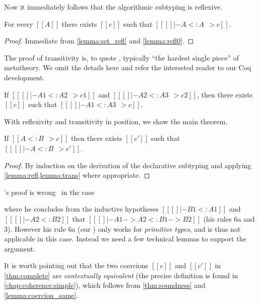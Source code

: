 Now it immediately follows that the algorithmic subtyping is reflexive.

\begin{lemma} \label{lemma:refl}
  For every $[[A]]$ there exists $[[c]]$ such that $[[ [] |- A <: A ~~> c]]$.
\end{lemma}
\begin{proof}
  Immediate from \cref{lemma:set_refl} and \cref{lemma:refl0}.
\end{proof}

The proof of transitivity is, to quote \citet{pierce1989decision}, typically
``the hardest single piece'' of metatheory. We omit the details here and
refer the interested reader to our Coq development.

\begin{lemma} \label{lemma:trans}
  If $[[ [] |- A1 <: A2 ~~> c1]]$ and $[[ [] |- A2 <: A3 ~~> c2]]$, then there
  exists $[[c]]$ such that $[[ [] |- A1 <: A3 ~~> c]]$.
\end{lemma}

With reflexivity and transitivity in position, we show the main theorem.

\begin{theorem} \label{thm:complete}
  If $[[A <: B ~~> c]]$ then there exists $[[c']]$ such that $[[ [] |- A <: B ~~> c']]$.
\end{theorem}
\begin{proof}
  By induction on the derivation of the declarative subtyping and applying \cref{lemma:refl,lemma:trans} where appropriate.
\end{proof}
\begin{remark}
  \citeauthor{pierce1989decision}'s proof is wrong~\cite[pp.~20, Case~F]{pierce1989decision} in the case
  \begin{mathpar}
  \end{mathpar}
  where he concludes from the inductive
  hypotheses $[[ [] |- B1 <: A1]]$ and $[[ [] |- A2 <: B2]]$ that $[[ [] |- A1 -> A2 <: B1 -> B2]]$ (his rules 6a and 3).
  However his rule 6a (our ) only works for \textit{primitive types}, and is thus not applicable in this case. Instead we
  need a few technical lemmas to support the argument.
\end{remark}

\begin{remark}
  It is worth pointing out that the two coercions $[[c]]$ and $[[c']]$ in
  \cref{thm:complete} are \textit{contextually equivalent} (the precise
  definition is found in \cref{chap:coherence:simple}), which follows from
  \cref{thm:soundness} and \cref{lemma:coercion_same}.
\end{remark}

